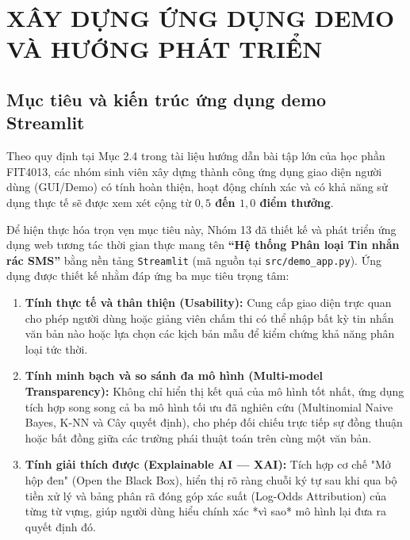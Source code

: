 \chapter{XÂY DỰNG ỨNG DỤNG DEMO VÀ HƯỚNG PHÁT TRIỂN}
\label{chap:chuong6}

\section{Mục tiêu và kiến trúc ứng dụng demo Streamlit}
\label{sec:muc-tieu-demo}

Theo quy định tại Mục 2.4 trong tài liệu hướng dẫn bài tập lớn của học phần FIT4013, các nhóm sinh viên xây dựng thành công ứng dụng giao diện người dùng (GUI/Demo) có tính hoàn thiện, hoạt động chính xác và có khả năng sử dụng thực tế sẽ được xem xét cộng từ \textbf{$0,5$ đến $1,0$ điểm thưởng}.

Để hiện thực hóa trọn vẹn mục tiêu này, Nhóm 13 đã thiết kế và phát triển ứng dụng web tương tác thời gian thực mang tên \textbf{“Hệ thống Phân loại Tin nhắn rác SMS”} bằng nền tảng \texttt{Streamlit} (mã nguồn tại \texttt{src/demo\_app.py}). Ứng dụng được thiết kế nhằm đáp ứng ba mục tiêu trọng tâm:
\begin{enumerate}
    \item \textbf{Tính thực tế và thân thiện (Usability):} Cung cấp giao diện trực quan cho phép người dùng hoặc giảng viên chấm thi có thể nhập bất kỳ tin nhắn văn bản nào hoặc lựa chọn các kịch bản mẫu để kiểm chứng khả năng phân loại tức thời.
    \item \textbf{Tính minh bạch và so sánh đa mô hình (Multi-model Transparency):} Không chỉ hiển thị kết quả của mô hình tốt nhất, ứng dụng tích hợp song song cả ba mô hình tối ưu đã nghiên cứu (Multinomial Naive Bayes, K-NN và Cây quyết định), cho phép đối chiếu trực tiếp sự đồng thuận hoặc bất đồng giữa các trường phái thuật toán trên cùng một văn bản.
    \item \textbf{Tính giải thích được (Explainable AI --- XAI):} Tích hợp cơ chế "Mở hộp đen" (Open the Black Box), hiển thị rõ ràng chuỗi ký tự sau khi qua bộ tiền xử lý và bảng phân rã đóng góp xác suất (Log-Odds Attribution) của từng từ vựng, giúp người dùng hiểu chính xác *vì sao* mô hình lại đưa ra quyết định đó.
\end{enumerate}

